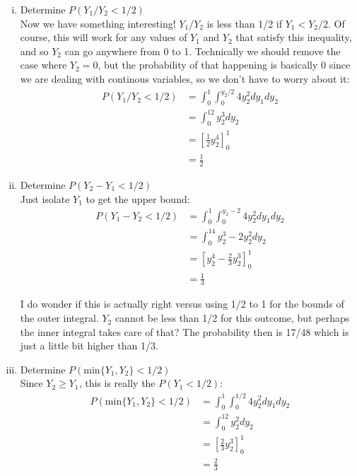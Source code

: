 \documentclass{scrartcl}
\begin{document}
\begin{enumerate}
\begin{enumerate}[i.]
      \item Determine $P(Y_1/Y_2<1/2)$\\

        Now we have something interesting! $Y_1/Y_2$ is less than 1/2 if $Y_1<Y_2/2$. Of course, this will work for any values of $Y_1$ and $Y_2$ that satisfy this inequality, and so $Y_2$ can go anywhere from 0 to 1. Technically we should remove the case where $Y_2=0$, but the probability of that happening is basically 0 since we are dealing with continous variables, so we don't have to worry about it:
        \begin{align*}
          P(Y_1/Y_2<1/2) &= \int_0^{1}\int_0^{y_2/2}4y_2^2dy_1dy_2\\
          &= \int_0^12y_2^3dy_2\\
          &= [\frac{1}{2}y_2^4]_0^1\\
          &= \frac{1}{2}
        \end{align*}
                
      \item Determine $P(Y_2-Y_1<1/2)$\\

        Just isolate $Y_1$ to get the upper bound:
        \begin{align*}
          P(Y_1-Y_2<1/2) &= \int_0^{1}\int_0^{y_2-2}4y_2^2dy_1dy_2\\
          &= \int_0^14y_2^3 - 2y_2^2dy_2\\
          &= [y_2^4-\frac{2}{3}y_2^3]_0^1\\
          &= \frac{1}{3}
        \end{align*}

        I do wonder if this is actually right versus using 1/2 to 1 for the bounds of the outer integral. $Y_2$ cannot be less than 1/2 for this outcome, but perhaps the inner integral takes care of that? The probability then is 17/48 which is just a little bit higher than 1/3.

      \item Determine $P(\text{min}\{Y_1,Y_2\}<1/2)$\\

        Since $Y_2\ge Y_1$, this is really the $P(Y_1<1/2)$:
        \begin{align*}
          P(\text{min}\{Y_1,Y_2\}<1/2) &= \int_0^{1}\int_0^{1/2}4y_2^2dy_1dy_2\\
          &= \int_0^12y_2^2dy_2\\
          &= [\frac{2}{3}y_2^3]_0^1\\
          &= \frac{2}{3}
        \end{align*}
        

\end{enumerate}
\end{enumerate}
\end{document}

